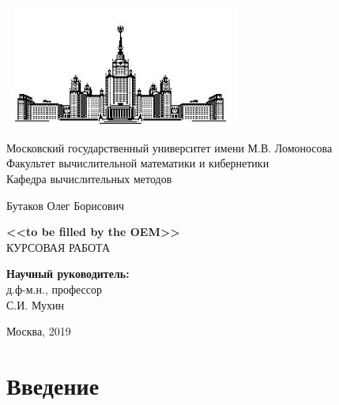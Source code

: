 \documentclass[14pt, a4paper, fleqn]{extreport}
\begin{document}
	
	\newcommand{\round}[1]{\stackrel{o}{#1}}
	\newcommand{\grad}{\text{grad }}
	\renewcommand{\div}{\text{div }}
	\newcommand{\rot}{\text{rot }}
	\newcommand{\hess}{\text{hess }}
	\newcommand{\laplace}{\mathop{}\!\mathbin\bigtriangleup}
		
	\begin{titlepage}
	\begin{center}
		\includegraphics[width=8cm, height=4cm]{MSU}
	\end{center}
	\begin{center}
			Московский государственный университет имени М.В. Ломоносова\\
			\vspace{0.1 cm}
			Факультет вычислительной математики и кибернетики\\
			\vspace{0.1 cm}
			Кафедра вычислительных методов
			
			\vspace{3cm}
			{\Large Бутаков Олег Борисович }\\
			\vspace{1cm}
			
			{\bf\LARGE <<to be filled by the OEM>>}\\ \vspace{2cm}
			КУРСОВАЯ РАБОТА
	\end{center}
	\vspace{2cm}
	\begin{flushright}
		{\bf Научный руководитель:}\\
		     д.ф-м.н., профессор \\
			 С.И. Мухин
	\end{flushright}		
	\vspace{4.5cm}
	\centerline {Москва, 2019}
	\end{titlepage}
	
	\tableofcontents
	\clearpage
	
	\chapter*{Введение}
		
\end{document}
